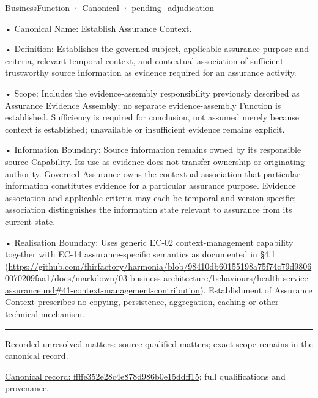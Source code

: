 \label{element:ffffe352e28c4e878d986b0e15ddff15}
{\small BusinessFunction · Canonical · pending\_adjudication}\par

•
Canonical Name: Establish Assurance Context.



•
Definition: Establishes the governed subject, applicable assurance purpose and criteria, relevant temporal context, and contextual association of sufficient trustworthy source information as evidence required for an assurance activity.



•
Scope: Includes the evidence-assembly responsibility previously described as Assurance Evidence Assembly; no separate evidence-assembly Function is established. Sufficiency is required for conclusion, not assumed merely because context is established; unavailable or insufficient evidence remains explicit.



•
Information Boundary: Source information remains owned by its responsible source Capability. Its use as evidence does not transfer ownership or originating authority. Governed Assurance owns the contextual association that particular information constitutes evidence for a particular assurance purpose. Evidence association and applicable criteria may each be temporal and version-specific; association distinguishes the information state relevant to assurance from its current state.



•
Realisation Boundary: Uses generic EC-02 context-management capability together with EC-14 assurance-specific semantics as documented in §4.1 (\url{https://github.com/fhirfactory/harmonia/blob/98410db60155198a75f74c79d98060070209faa1/docs/markdown/03-business-architecture/behaviours/health-service-assurance.md#41-context-management-contribution}). Establishment of Assurance Context prescribes no copying, persistence, aggregation, caching or other technical mechanism.



\medskip\hrule\medskip

{\small Recorded unresolved matters: source-qualified matters; exact scope remains in the canonical record.}\par
{\footnotesize \href{../../../../../../../continuum/business/business-function/ffffe352e28c4e878d986b0e15ddff15.md}{Canonical record: ffffe352e28c4e878d986b0e15ddff15}; full qualifications and provenance.}\par
